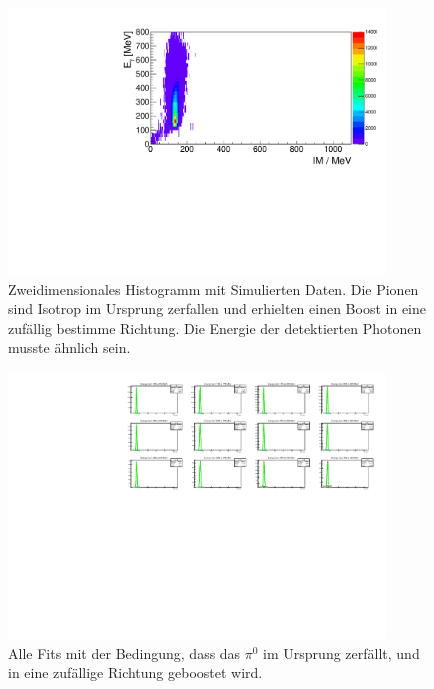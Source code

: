 \documentclass[a4paper,11pt,oneside,final,german,openbib,pdftex]{scrbook}
\begin{document}
{\begin{appendix}
\begin{figure}[h!]
	\begin{center}
		\includegraphics[width=100mm]{NewCalib/UrsprungIsotrop/20171904SimUrsprungIsotropNoCutHist}
		\caption[Simulation: 2D-Hist Isotroper Boost im Ursprung ]{Zweidimensionales Histogramm mit Simulierten Daten. Die Pionen sind Isotrop im Ursprung zerfallen und erhielten einen Boost in eine zuf\"allig bestimme Richtung. Die Energie der detektierten Photonen musste \"ahnlich sein.}
		\label{fig:Sim-Data-Ursprung-2DHist-No-Cut}
	\end{center}
\end{figure}

\begin{figure}[h!]
	\begin{center}
		\includegraphics[width=100mm]{NewCalib/UrsprungIsotrop/20171904SimIsotropUrsprungNoCutAllFits}
\caption[Simulation: Isotroper Boost im Ursprung alle Fits]{Alle Fits mit der Bedingung, dass das $\pi^0$ im Ursprung zerf\"allt, und in eine zuf\"allige Richtung geboostet wird. }
\label{fig:All-Fits-Isotrop-No-Cut}
\end{center}

\end{figure}


\end{appendix}}
\end{document}
